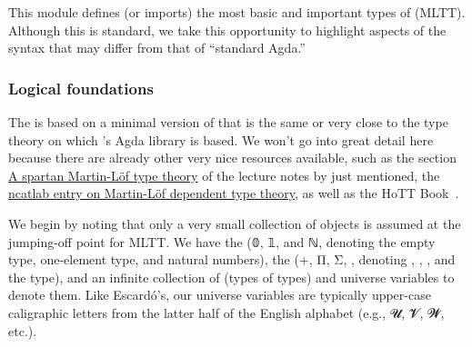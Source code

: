 This module defines (or imports) the most basic and important types of  (MLTT).  Although this is standard, we take this opportunity to highlight aspects of the \ualib syntax that may differ from that of ``standard Agda.''

\subsubsection{Logical foundations}\label{sec:logical-foundations}
The \ualib is based on a minimal version of \mltt that is the same or very close to the type theory on which \MartinEscardo's \TypeTopology Agda library is based.
We won't go into great detail here because there are already other very nice resources available, such as the section \href{https://www.cs.bham.ac.uk/~mhe/HoTT-UF-in-Agda-Lecture-Notes/HoTT-UF-Agda.html\#mlttinagda}{A spartan Martin-Löf type theory} of the lecture notes by \escardo just mentioned, the \href{https://ncatlab.org/nlab/show/Martin-L\%C3\%B6f+dependent+type+theory}{ncatlab entry on Martin-Löf dependent type theory}, as well as the HoTT Book~\cite{HoTT}.

We begin by noting that only a very small collection of objects is assumed at the jumping-off point for MLTT. We have the  (\ad 𝟘, \ad 𝟙, and \ad ℕ, denoting the empty type, one-element type, and natural numbers), the  (\ad +, \ad Π, \ad Σ, , denoting , , , and the  type), and an infinite collection of  (types of types) and universe variables to denote them.  Like Escard\'o's, our universe variables are typically upper-case caligraphic letters from the latter half of the English alphabet (e.g., \ab 𝓤, \ab 𝓥, \ab 𝓦, etc.).

